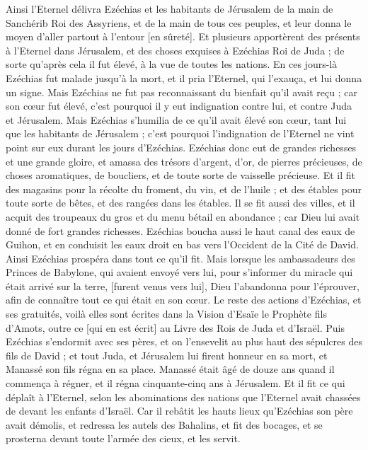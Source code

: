 \begin{multicols}{2}
Ainsi l'Eternel délivra Ezéchias et les habitants de Jérusalem de la main de Sanchérib Roi des Assyriens, et de la main de tous ces peuples, et leur donna le moyen d'aller partout à l'entour [en sûreté].
Et plusieurs apportèrent des présents à l'Eternel dans Jérusalem, et des choses exquises à Ezéchias Roi de Juda ; de sorte qu'après cela il fut élevé, à la vue de toutes les nations.
En ces jours-là Ezéchias fut malade jusqu'à la mort, et il pria l'Eternel, qui l'exauça, et lui donna un signe.
Mais Ezéchias ne fut pas reconnaissant du bienfait qu'il avait reçu ; car son cœur fut élevé, c'est pourquoi il y eut indignation contre lui, et contre Juda et Jérusalem.
Mais Ezéchias s'humilia de ce qu'il avait élevé son cœur, tant lui que les habitants de Jérusalem ; c'est pourquoi l'indignation de l'Eternel ne vint point sur eux durant les jours d'Ezéchias.
Ezéchias donc eut de grandes richesses et une grande gloire, et amassa des trésors d'argent, d'or, de pierres précieuses, de choses aromatiques, de boucliers, et de toute sorte de vaisselle précieuse.
Et il fit des magasins pour la récolte du froment, du vin, et de l'huile ; et des étables pour toute sorte de bêtes, et des rangées dans les étables.
Il se fit aussi des villes, et il acquit des troupeaux du gros et du menu bétail en abondance ; car Dieu lui avait donné de fort grandes richesses.
Ezéchias boucha aussi le haut canal des eaux de Guihon, et en conduisit les eaux droit en bas vers l'Occident de la Cité de David. Ainsi Ezéchias prospéra dans tout ce qu'il fit.
Mais lorsque les ambassadeurs des Princes de Babylone, qui avaient envoyé vers lui, pour s'informer du miracle qui était arrivé sur la terre, [furent venus vers lui], Dieu l'abandonna pour l'éprouver, afin de connaître tout ce qui était en son cœur.
Le reste des actions d'Ezéchias, et ses gratuités, voilà elles sont écrites dans la Vision d'Esaïe le Prophète fils d'Amots, outre ce [qui en est écrit] au Livre des Rois de Juda et d'Israël.
Puis Ezéchias s'endormit avec ses pères, et on l'ensevelit au plus haut des sépulcres des fils de David ; et tout Juda, et Jérusalem lui firent honneur en sa mort, et Manassé son fils régna en sa place.
\VerseOne{}Manassé était âgé de douze ans quand il commença à régner, et il régna cinquante-cinq ans à Jérusalem.
Et il fit ce qui déplaît à l'Eternel, selon les abominations des nations que l'Eternel avait chassées de devant les enfants d'Israël.
Car il rebâtit les hauts lieux qu'Ezéchias son père avait démolis, et redressa les autels des Bahalins, et fit des bocages, et se prosterna devant toute l'armée des cieux, et les servit.

\end{multicols}
